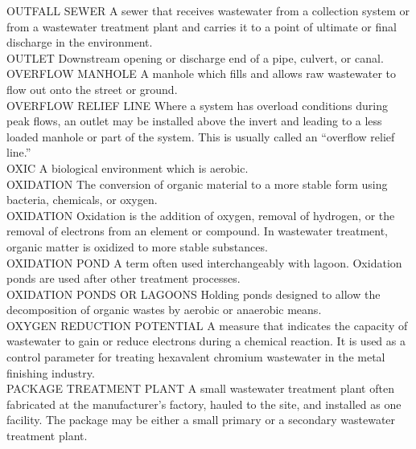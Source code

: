 OUTFALL SEWER
A sewer that receives wastewater from a collection system or from a wastewater treatment plant and carries it to a point of ultimate or final discharge in the environment. 
\vspace{0.3cm}\\
OUTLET
Downstream opening or discharge end of a pipe, culvert, or canal. 
\vspace{0.3cm}\\
OVERFLOW MANHOLE
A manhole which fills and allows raw wastewater to flow out onto the street or ground. 
\vspace{0.3cm}\\
OVERFLOW RELIEF LINE
Where a system has overload conditions during peak flows, an outlet may be installed above the invert and leading to a less loaded manhole or part of the system. This is usually called an “overflow relief line.” 
\vspace{0.3cm}\\
OXIC
A biological environment which is aerobic.
\vspace{0.3cm}\\
OXIDATION
The conversion of organic material to a more stable form using bacteria, chemicals, or oxygen.
\vspace{0.3cm}\\
OXIDATION
Oxidation is the addition of oxygen, removal of hydrogen, or the removal of electrons from an element or compound. In wastewater treatment, organic matter is oxidized to more stable substances.
\vspace{0.3cm}\\
OXIDATION POND
A term often used interchangeably with lagoon. Oxidation ponds are used after other treatment processes.
\vspace{0.3cm}\\
OXIDATION PONDS OR LAGOONS
Holding ponds designed to allow the decomposition of organic wastes by aerobic or anaerobic means.
\vspace{0.3cm}\\
OXYGEN REDUCTION POTENTIAL
A measure that indicates the capacity of wastewater to gain or reduce electrons during a chemical reaction. It is used as a control parameter for treating hexavalent chromium wastewater in the metal finishing industry.
\vspace{0.3cm}\\
PACKAGE TREATMENT PLANT
A small wastewater treatment plant often fabricated at the manufacturer’s factory, hauled to the site, and installed as one facility. The package may be either a small primary or a secondary wastewater treatment plant.
